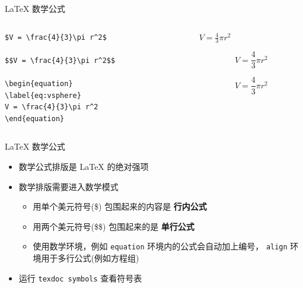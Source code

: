 \begin{frame}[fragile]{\LaTeX{} 数学公式}

\begin{columns}
\begin{column}{.5\textwidth}
\begin{lstlisting}[basicstyle=\ttfamily\small]
$V = \frac{4}{3}\pi r^2$

$$V = \frac{4}{3}\pi r^2$$

\begin{equation}
\label{eq:vsphere}
V = \frac{4}{3}\pi r^2
\end{equation}
\end{lstlisting}
\end{column}

\begin{column}{.5\textwidth}
$V = \frac{4}{3}\pi r^2$

$$V = \frac{4}{3}\pi r^2$$

\begin{equation}
\label{eq:vsphere}
V = \frac{4}{3}\pi r^2
\end{equation}
\end{column}
\end{columns}

\end{frame}

\begin{frame}{\LaTeX{} 数学公式}
\begin{itemize}
\item 数学公式排版是 \LaTeX{} 的绝对强项
\item 数学排版需要进入数学模式
	\begin{itemize}
	\item 用单个美元符号(\$) 包围起来的内容是 {\bf 行内公式}
	\item 用两个美元符号(\$\$) 包围起来的是 {\bf 单行公式}
	\item 使用数学环境，例如 \texttt{equation} 环境内的公式会自动加上编号，
		\texttt{align} 环境用于多行公式(例如方程组)
	\end{itemize}
\item 运行 \texttt{texdoc symbols} 查看符号表
\end{itemize}
\end{frame}

